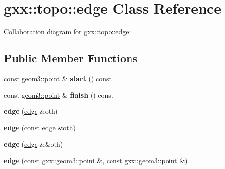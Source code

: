 \hypertarget{classgxx_1_1topo_1_1edge}{}\section{gxx\+:\+:topo\+:\+:edge Class Reference}
\label{classgxx_1_1topo_1_1edge}


Collaboration diagram for gxx\+:\+:topo\+:\+:edge\+:
\subsection*{Public Member Functions}
\begin{DoxyCompactItemize}
\item 
const \hyperlink{classgxx_1_1geom3_1_1point}{geom3\+::point} \& {\bfseries start} () const \hypertarget{classgxx_1_1topo_1_1edge_ae09c1e3d060f65a56834a53b79f34228}{}\label{classgxx_1_1topo_1_1edge_ae09c1e3d060f65a56834a53b79f34228}

\item 
const \hyperlink{classgxx_1_1geom3_1_1point}{geom3\+::point} \& {\bfseries finish} () const \hypertarget{classgxx_1_1topo_1_1edge_ae830c7645360da61e7ed4e8800b5c88b}{}\label{classgxx_1_1topo_1_1edge_ae830c7645360da61e7ed4e8800b5c88b}

\item 
{\bfseries edge} (\hyperlink{classgxx_1_1topo_1_1edge}{edge} \&oth)\hypertarget{classgxx_1_1topo_1_1edge_a4eac7d48227699ac0123224c16bde4d0}{}\label{classgxx_1_1topo_1_1edge_a4eac7d48227699ac0123224c16bde4d0}

\item 
{\bfseries edge} (const \hyperlink{classgxx_1_1topo_1_1edge}{edge} \&oth)\hypertarget{classgxx_1_1topo_1_1edge_aae36929460667329695131fbc85fcabc}{}\label{classgxx_1_1topo_1_1edge_aae36929460667329695131fbc85fcabc}

\item 
{\bfseries edge} (\hyperlink{classgxx_1_1topo_1_1edge}{edge} \&\&oth)\hypertarget{classgxx_1_1topo_1_1edge_a2efc46bf181954bbbf1ba7aef08f0bb5}{}\label{classgxx_1_1topo_1_1edge_a2efc46bf181954bbbf1ba7aef08f0bb5}

\item 
{\bfseries edge} (const \hyperlink{classgxx_1_1geom3_1_1point}{gxx\+::geom3\+::point} \&, const \hyperlink{classgxx_1_1geom3_1_1point}{gxx\+::geom3\+::point} \&)\hypertarget{classgxx_1_1topo_1_1edge_a1f6393a212c2315d95bbd942430028f0}{}\label{classgxx_1_1topo_1_1edge_a1f6393a212c2315d95bbd942430028f0}


\end{DoxyCompactItemize}
